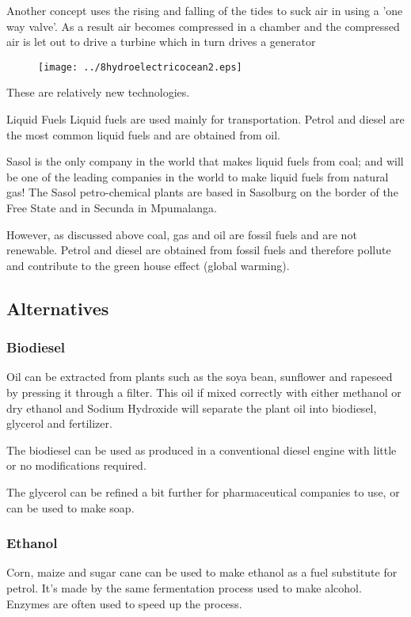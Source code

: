 Another concept uses the rising and falling of the tides to suck air
in using a 'one way valve'. As a result air becomes compressed in a
chamber and the compressed air is let out to drive a turbine which
in turn drives a generator

\begin{figure}[H]
\centering
\texttt{[image: ../8hydroelectricocean2.eps]}
\end{figure}

These are relatively new technologies.

Liquid Fuels Liquid fuels are used mainly for transportation. Petrol
and diesel are the most common liquid fuels and are obtained from
oil.

Sasol is the only company in the world that makes liquid fuels from
coal; and will be one of the leading companies in the world to make
liquid fuels from natural gas! The Sasol petro-chemical plants are
based in Sasolburg on the border of the Free State and in Secunda in
Mpumalanga.

However, as discussed above coal, gas and oil are fossil fuels and
are not renewable. Petrol and diesel are obtained from fossil fuels
and therefore pollute and contribute to the green house effect
(global warming).

\subsection*{Alternatives}

\subsubsection*{Biodiesel} Oil can be extracted from plants such as the
soya bean, sunflower and rapeseed by pressing it through a filter.
This oil if mixed correctly with either methanol or dry ethanol and
Sodium Hydroxide will separate the plant oil into biodiesel,
glycerol and fertilizer.

The biodiesel can be used as produced in a conventional diesel
engine with little or no modifications required.

The glycerol can be refined a bit further for pharmaceutical
companies to use, or can be used to make soap.

\subsubsection*{Ethanol}

Corn, maize and sugar cane can be used to make ethanol as a fuel
substitute for petrol. It's made by the same fermentation process
used to make alcohol. Enzymes are often used to speed up the
process.

